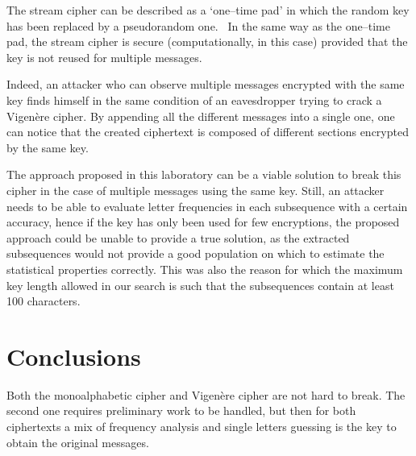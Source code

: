 \documentclass[12pt]{article}
\begin{document}
The stream cipher can be described as a `one–time pad' in which the random key has been replaced by a pseudorandom one. \
In the same way as the one–time pad, the stream cipher is secure (computationally, in this case) provided that the key is not reused for multiple messages.

Indeed, an attacker who can observe multiple messages encrypted with the same key finds himself in the same condition of an eavesdropper trying to crack a Vigenère cipher. By appending all the different messages into a single one, one can notice that the created ciphertext is composed of different sections encrypted by the same key.

The approach proposed in this laboratory can be a viable solution to break this cipher in the case of multiple messages using the same key. 
Still, an attacker needs to be able to evaluate letter frequencies in each subsequence with a certain accuracy, hence if the key has only been used for few encryptions, the proposed approach could be unable to provide a true solution, as the extracted subsequences would not provide a good population on which to estimate the statistical properties correctly.
This was also the reason for which the maximum key length allowed in our search is such that the subsequences contain at least 100 characters.

\section{Conclusions}

Both the monoalphabetic cipher and Vigenère cipher are not hard to break. The second one requires preliminary work to be handled, but then for both ciphertexts a mix of frequency analysis and single letters guessing is the key to obtain the original messages.

\pagebreak
\end{document}
